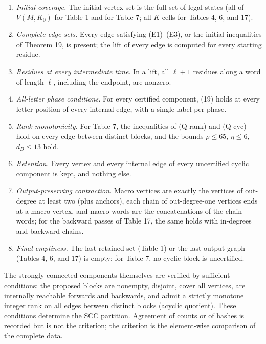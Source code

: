 \documentclass[11pt,reqno]{amsart}
\theoremstyle{definition}
\theoremstyle{remark}
\providecommand{\tightlist}{\setlength{\itemsep}{0pt}\setlength{\parskip}{0pt}}
\begin{document}
\begin{enumerate}
\def\labelenumi{\arabic{enumi}.}
\tightlist
\item
  \emph{Initial coverage.} The initial vertex set is the full set of legal
  states (all of \(V(M,K_0)\) for Table 1 and for Table 7; all \(K\)
  cells for Tables 4, 6, and 17).
\item
  \emph{Complete edge sets.} Every edge satisfying (E1)--(E3), or the initial
  inequalities of Theorem 19, is present; the lift of every edge is
  computed for every starting residue.
\item
  \emph{Residues at every intermediate time.} In a lift, all
  \(\ell+1\) residues along a word of length \(\ell\), including the
  endpoint, are nonzero.
\item
  \emph{All-letter phase conditions.} For every certified component, (19)
  holds at every letter position of every internal edge, with a single
  label per phase.
\item
  \emph{Rank monotonicity.} For Table 7, the inequalities of (Q-rank) and
  (Q-cyc) hold on every edge between distinct blocks, and the bounds
  \(\rho\le65\), \(\eta\le6\), \(d_B\le13\) hold.
\item
  \emph{Retention.} Every vertex and every internal edge of every uncertified
  cyclic component is kept, and nothing else.
\item
  \emph{Output-preserving contraction.} Macro vertices are exactly the
  vertices of out-degree at least two (plus anchors), each chain of
  out-degree-one vertices ends at a macro vertex, and macro words are the
  concatenations of the chain words; for the backward passes of
  Table 17, the same holds with in-degrees and backward chains.
\item
  \emph{Final emptiness.} The last retained set (Table 1) or the last output
  graph (Tables 4, 6, and 17) is empty; for Table 7, no cyclic block is
  uncertified.
\end{enumerate}

The strongly connected components themselves are verified by sufficient
conditions: the proposed blocks are nonempty, disjoint, cover all
vertices, are internally reachable forwards and backwards, and admit a
strictly monotone integer rank on all edges between distinct blocks
(acyclic quotient). These conditions determine the SCC partition.
Agreement of counts or of hashes is recorded but is not the criterion;
the criterion is the element-wise comparison of the complete data.
\end{document}
